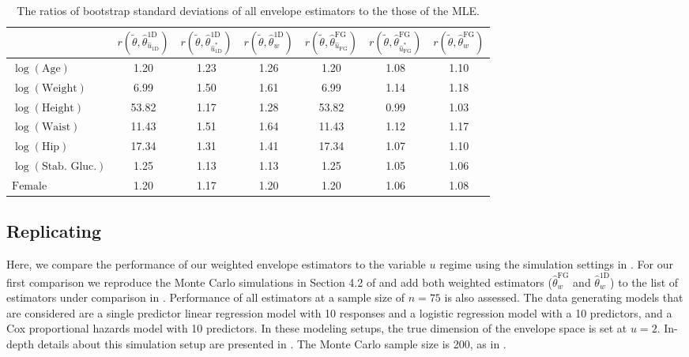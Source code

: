 \documentclass{article}\usepackage[]{graphicx}\usepackage[]{color}
\newcommand{\TFG}{\widehat{\theta}^{\text{FG}}}
\newcommand{\TD}{\widehat{\theta}^{\text{1D}}}
\begin{document}
\begin{table}[t]
\caption{\footnotesize The ratios of bootstrap standard deviations of all envelope estimators to the those of the MLE.
} 
\begin{center}
\begin{tabular}{lcccccc}   
  & $r(\widetilde{\theta},\TD_{\hat{u}_{\text{1D}}})$ &
   	$r(\widetilde{\theta},\TD_{\hat{u}^{*}_{\text{1D}}})$ & 
    $r(\widetilde{\theta},\TD_w)$  &
   	$r(\widetilde{\theta},\TFG_{\hat{u}_{\text{FG}}})$ &    
   	$r(\widetilde{\theta},\TFG_{\hat{u}^{*}_{\text{FG}}})$ &
   	$r(\widetilde{\theta},\TFG_w)$ \\   
   \hline
$\log(\text{Age})$         &  1.20 & 1.23 & 1.26 &  1.20 & 1.08 & 1.10 \\
$\log(\text{Weight})$      &  6.99 & 1.50 & 1.61 &  6.99 & 1.14 & 1.18 \\
$\log(\text{Height})$      & 53.82 & 1.17 & 1.28 & 53.82 & 0.99 & 1.03 \\
$\log(\text{Waist})$       & 11.43 & 1.51 & 1.64 & 11.43 & 1.12 & 1.17 \\
$\log(\text{Hip})$         & 17.34 & 1.31 & 1.41 & 17.34 & 1.07 & 1.10 \\
$\log(\text{Stab. Gluc.})$ &  1.25 & 1.13 & 1.13 &  1.25 & 1.05 & 1.06 \\
$\text{Female}$            &  1.20 & 1.17 & 1.20 &  1.20 & 1.06 & 1.08 \\
\hline
\end{tabular}
\end{center}
\label{Tab:diabetesperform}
\end{table}



\subsection{Replicating \citet{zhangmai}}
\label{sec:repro}

Here, we compare the performance of our weighted envelope estimators to the variable $u$ regime using the simulation settings in \citet{zhangmai}. For our first comparison we reproduce the Monte Carlo simulations in Section 4.2 of \citet{zhangmai} and add both weighted estimators ($\TFG_w$ and $\TD_w$) to the list of estimators under comparison in \citet{zhangmai}. Performance of all estimators at a sample size of $n = 75$ is also assessed. The data generating models that are considered are a single predictor linear regression model with 10 responses and a logistic regression model with a 10 predictors, and a Cox proportional hazards model with 10 predictors. In these modeling setups, the true dimension of the envelope space is set at $u = 2$. In-depth details about this simulation setup are presented in \citet{zhangmai}. The Monte Carlo sample size is 200, as in \citet{zhangmai}.
\end{document}
